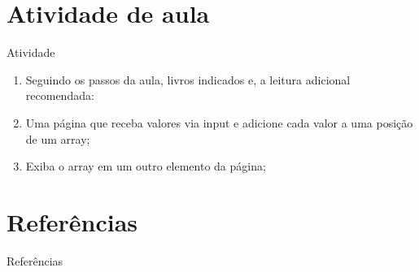 \documentclass{beamer}
\begin{document}
\section{Atividade de aula}
\begin{frame}{Atividade}
  \begin{enumerate}
      \item Seguindo os passos da aula, livros indicados e, a leitura adicional recomendada: 
      \item Uma página que receba valores via input e adicione cada valor a uma posição de um array;
      \item Exiba o array em um outro elemento da página;
  \end{enumerate}


\end{frame}
\section{Referências}

\begin{frame}{Referências}%
\small
\begin{center}
\tiny


\end{center}
\end{frame}
\end{document}
